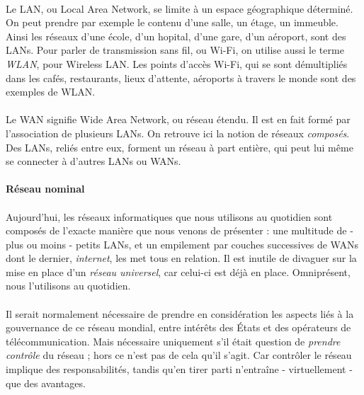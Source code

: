 \paragraph{} Le LAN, ou Local Area Network, se limite à un espace géographique déterminé. On peut prendre
par exemple le contenu d'une salle, un étage, un immeuble. Ainsi les réseaux d'une école, d'un
hopital, d'une gare, d'un aéroport, sont des LANs. Pour parler de transmission sans fil, ou
Wi-Fi, on utilise aussi le terme \emph{WLAN}, pour Wireless LAN. Les points d'accès Wi-Fi, qui se
sont démultipliés dans les cafés, restaurants, lieux d'attente, aéroports à travers le monde
sont des exemples de WLAN.

\paragraph{} Le WAN signifie Wide Area Network, ou réseau étendu. Il est en fait formé par
l'association de plusieurs LANs. On retrouve ici la notion de réseaux \emph{composés}. Des LANs,
reliés entre eux, forment un réseau à part entière, qui peut lui même se connecter à d'autres
LANs ou WANs.


\paragraph{Réseau nominal} 

\paragraph{} Aujourd'hui, les réseaux informatiques que nous utilisons au quotidien sont composés
de l'exacte manière que nous venons de présenter : une multitude de - plus ou moins - petits LANs, et un empilement
par couches successives de WANs dont le dernier, \emph{internet}, les met tous en relation. Il est inutile de divaguer
sur la mise en place d'un \emph{réseau universel}, car celui-ci est déjà en place. Omniprésent, nous l'utilisons au
quotidien.

\paragraph{} Il serait normalement nécessaire de prendre en considération les aspects liés à la gouvernance de ce réseau 
mondial, entre intérêts des États et des opérateurs de télécommunication. Mais nécessaire uniquement s'il était question
de \emph{prendre contrôle} du réseau ; hors ce n'est pas de cela qu'il s'agit. Car contrôler le réseau implique des 
responsabilités, tandis qu'en tirer parti n'entraîne - virtuellement - que des avantages.

